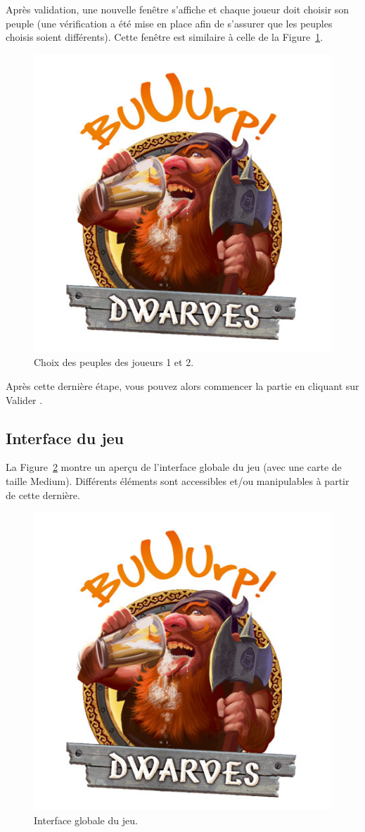 Après validation, une nouvelle fenêtre s'affiche et chaque joueur doit choisir son peuple (une vérification a été mise en place afin de s'assurer que les peuples choisis soient différents). Cette fenêtre est similaire à celle de la {\sc Figure}~\ref{fig:choicePeoples}.

\begin{figure}
    \centering
    \includegraphics[height=0.70\textwidth]{figure/choicePeoples.png}
    \caption{Choix des peuples des joueurs 1 et 2.}
    \label{fig:choicePeoples}
\end{figure}

Après cette dernière étape, vous pouvez alors commencer la partie en cliquant sur \og Valider \fg{}.

\subsection{Interface du jeu}

La {\sc Figure}~\ref{fig:game} montre un aperçu de l'interface globale du jeu (avec une carte de taille Medium). Différents éléments sont accessibles et/ou manipulables à partir de cette dernière.

\begin{figure}
    \centering
    \includegraphics[height=0.70\textwidth]{figure/choicePeoples.png}
    \caption{Interface globale du jeu.}
    \label{fig:game}
\end{figure}

